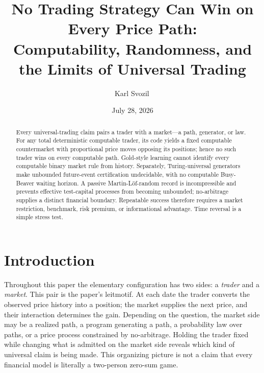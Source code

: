 \documentclass[aps,pra,reprint,superscriptaddress,amsmath,amssymb,floatfix]{revtex4-2}
\theoremstyle{plain}
\theoremstyle{definition}
\theoremstyle{remark}
\begin{document}
\title{No Trading Strategy Can Win on Every Price Path:\\
Computability, Randomness, and the Limits of Universal Trading}

\author{Karl Svozil\,}

\date{July 28, 2026}

\begin{abstract}
Every universal-trading claim pairs a trader with a market---a path, generator,
or law. For any total deterministic computable trader, its code yields a fixed
computable countermarket with proportional price moves opposing its positions;
hence no such trader wins on every computable path. Gold-style learning cannot
identify every computable binary market rule from history. Separately,
Turing-universal generators make unbounded future-event certification
undecidable, with no computable Busy-Beaver waiting horizon. A passive
Martin-L\"of-random record is incompressible and prevents effective test-capital
processes from becoming unbounded; no-arbitrage supplies a distinct financial
boundary. Repeatable success therefore requires a market restriction,
benchmark, risk premium, or informational advantage. Time reversal is a simple
stress test.
\end{abstract}

\maketitle

\section{Introduction}
\label{sec:intro}

Throughout this paper the elementary configuration has two sides: a
\emph{trader} and a \emph{market}. This pair is the paper's leitmotif. At each
date the trader converts the observed price history into a position; the
market supplies the next price, and their interaction determines the gain.
Depending on the question, the market side may be a realized path, a program
generating a path, a probability law over paths, or a price process constrained
by no-arbitrage. Holding the trader fixed while changing what is admitted on
the market side reveals which kind of universal claim is being made. This
organizing picture is not a claim that every financial model is literally a
two-person zero-sum game.
\end{document}

